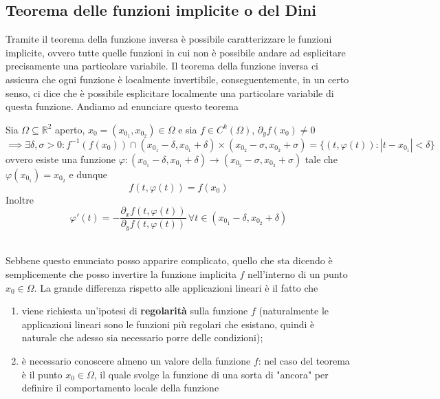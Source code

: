 \documentclass[openany, italian]{book}
\begin{document}
\begin{theorem}
\section{Teorema delle funzioni implicite o del Dini}
Tramite il teorema della funzione inversa è possibile caratterizzare le funzioni implicite, ovvero tutte quelle funzioni in cui non è possibile andare ad esplicitare precisamente una particolare variabile. Il teorema della funzione inversa ci assicura che ogni funzione è localmente invertibile, conseguentemente, in un certo senso, ci dice che è possibile esplicitare localmente una particolare variabile di questa funzione. Andiamo ad enunciare questo teorema
\begin{theorem}
Sia $\Omega \subseteq \mathbb{R}^2$ aperto, $x_0 = (x_{0_1}, x_{0_2}) \in \Omega$ e sia $f \in C^k (\Omega)$, $\partial_y f(x_0) \neq 0$
$$\implies \exists \delta, \sigma > 0 : f^{-1}(f(x_0)) \cap (x_{0_1}-\delta, x_{0_1}+\delta) \times (x_{0_2} - \sigma, x_{0_2}+\sigma) = \{(t, \varphi(t)) : |t-x_{0_1}| < \delta \}$$
ovvero esiste una funzione $\varphi: (x_{0_1} - \delta, x_{0_1} + \delta) \to (x_{0_2}-\sigma, x_{0_2} + \sigma)$ tale che $\varphi(x_{0_1}) = x_{0_2}$ e dunque
$$
f(t, \varphi(t)) = f(x_0)
$$
Inoltre
$$
\varphi'(t)=-\frac{\partial_x f(t, \varphi(t))}{\partial_y f(t, \varphi(t))} \, \forall t \in (x_{0_1} - \delta, x_{0_2} + \delta)
$$
\end{theorem}
\hspace{1cm} \\
Sebbene questo enunciato posso apparire complicato, quello che sta dicendo è semplicemente che posso invertire la funzione implicita $f$ nell'interno di un punto $x_0 \in \Omega$. La grande differenza rispetto alle applicazioni lineari è il fatto che
\begin{enumerate}[label=\protect\circled{\arabic*}]
	\item viene richiesta un'ipotesi di \textbf{regolarità} sulla funzione $f$ (naturalmente le applicazioni lineari sono le funzioni più regolari che esistano, quindi è naturale che adesso sia necessario porre delle condizioni);
	\item è necessario conoscere almeno un valore della funzione $f$: nel caso del teorema è il punto $x_0 \in \Omega$, il quale svolge la funzione di una sorta di "ancora" per definire il comportamento locale della funzione
\end{enumerate}
\end{theorem}
\end{document}
